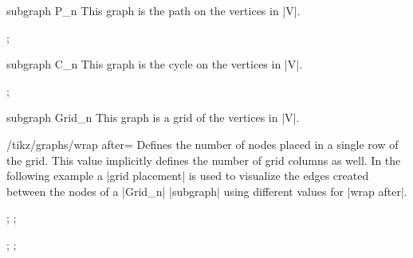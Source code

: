 \begin{graph}{subgraph P\_n}
  This graph is the path on the vertices in |V|.
\begin{codeexample}[]
\tikz {};    
\end{codeexample}
\end{graph}


\begin{graph}{subgraph C\_n}
  This graph is the cycle on the vertices in |V|.
\begin{codeexample}[]
\tikz {};    
\end{codeexample}
\end{graph}


\begin{graph}{subgraph Grid\_n}
  This graph is a grid of the vertices in |V|.
  \begin{key}{/tikz/graphs/wrap after=}
    Defines the number of nodes placed in a single row of the grid. This
    value implicitly defines the number of grid columns as well.
    In the following example a |grid placement| is used to visualize the
    edges created between the nodes of a |Grid_n| |subgraph| using
    different values for |wrap after|.
    \begin{codeexample}[]
\tikz {};
\tikz {};
    \end{codeexample}
    \begin{codeexample}[]
\tikz {};
\tikz {};
    \end{codeexample}
  \end{key}
\end{graph}


%
%  



